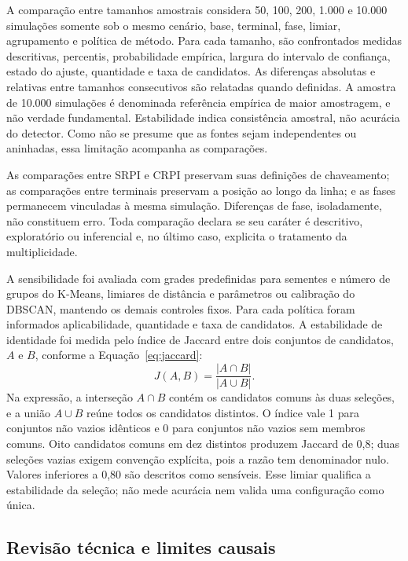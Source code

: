 \documentclass[
	12pt,				%
	openright,			%
	oneside,			%
	a4paper,			%
	chapter=TITLE,		%
	section=TITLE,		%
	subsection=TITLE,	%
	subsubsection=TITLE,%
	english,			%
	brazilian			%
	]{abntex2}
\theoremstyle{definition}
\begin{document}
A comparação entre tamanhos amostrais considera 50, 100, 200, 1.000 e 10.000 simulações
somente sob o mesmo cenário, base, terminal, fase, limiar, agrupamento e
política de método. Para cada tamanho, são confrontados medidas descritivas,
percentis, probabilidade empírica, largura do intervalo de confiança, estado
do ajuste, quantidade e taxa de candidatos. As diferenças absolutas e
relativas entre tamanhos consecutivos são relatadas quando definidas. A
amostra de 10.000 simulações é denominada referência empírica de maior
amostragem, e não verdade fundamental. Estabilidade indica consistência
amostral, não acurácia do detector. Como não se presume que as fontes sejam
independentes ou aninhadas, essa limitação acompanha as comparações.

As comparações entre SRPI e CRPI preservam suas definições de chaveamento; as
comparações entre terminais preservam a posição ao longo da linha; e as fases
permanecem vinculadas à mesma simulação. Diferenças de fase, isoladamente, não
constituem erro. Toda comparação declara se seu caráter é descritivo,
exploratório ou inferencial e, no último caso, explicita o tratamento da
multiplicidade.

A sensibilidade foi avaliada com grades predefinidas para sementes e número de
grupos do K-Means, limiares de distância e parâmetros ou calibração do
DBSCAN, mantendo os demais controles fixos. Para cada política foram informados
aplicabilidade, quantidade e taxa de candidatos. A estabilidade de identidade
foi medida pelo índice de Jaccard entre dois conjuntos de candidatos, $A$ e $B$,
conforme a Equação~\ref{eq:jaccard}:
\begin{equation}
\label{eq:jaccard}
J(A,B)=\frac{|A\cap B|}{|A\cup B|}.
\end{equation}
Na expressão, a interseção $A\cap B$ contém os candidatos comuns às duas
seleções, e a união $A\cup B$ reúne todos os candidatos distintos.
O índice vale 1 para conjuntos não vazios idênticos e 0 para conjuntos
não vazios sem membros comuns. Oito candidatos comuns em dez distintos
produzem Jaccard de 0,8; duas seleções vazias exigem convenção explícita,
pois a razão tem denominador nulo.
Valores inferiores a 0,80 são descritos como sensíveis. Esse limiar qualifica
a estabilidade da seleção; não mede acurácia nem valida uma configuração como
única.

\subsection{Revisão técnica e limites causais}
\end{document}
